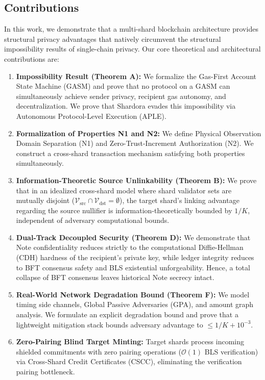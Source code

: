 \documentclass[journal,10pt,twocolumn]{IEEEtran}
\theoremstyle{definition}
\theoremstyle{remark}
\begin{document}
\subsection{Contributions}
In this work, we demonstrate that a multi-shard blockchain architecture provides structural privacy advantages that natively circumvent the structural impossibility results of single-chain privacy. Our core theoretical and architectural contributions are:
\begin{enumerate}[leftmargin=*]
    \item \textbf{Impossibility Result (Theorem A):} We formalize the Gas-First Account State Machine (GASM) and prove that no protocol on a GASM can simultaneously achieve sender privacy, recipient gas autonomy, and decentralization. We prove that Shardora evades this impossibility via Autonomous Protocol-Level Execution (APLE).
    \item \textbf{Formalization of Properties N1 and N2:} We define Physical Observation Domain Separation (N1) and Zero-Trust-Increment Authorization (N2). We construct a cross-shard transaction mechanism satisfying both properties simultaneously.
    \item \textbf{Information-Theoretic Source Unlinkability (Theorem B):} We prove that in an idealized cross-shard model where shard validator sets are mutually disjoint ($\mathcal{V}_{\text{src}} \cap \mathcal{V}_{\text{dst}} = \emptyset$), the target shard's linking advantage regarding the source nullifier is information-theoretically bounded by $1/K$, independent of adversary computational bounds.
    \item \textbf{Dual-Track Decoupled Security (Theorem D):} We demonstrate that Note confidentiality reduces strictly to the computational Diffie-Hellman (CDH) hardness of the recipient's private key, while ledger integrity reduces to BFT consensus safety and BLS existential unforgeability. Hence, a total collapse of BFT consensus leaves historical Note secrecy intact.
    \item \textbf{Real-World Network Degradation Bound (Theorem F):} We model timing side channels, Global Passive Adversaries (GPA), and amount graph analysis. We formulate an explicit degradation bound and prove that a lightweight mitigation stack bounds adversary advantage to $\le 1/K + 10^{-3}$.
    \item \textbf{Zero-Pairing Blind Target Minting:} Target shards process incoming shielded commitments with zero pairing operations ($\mathcal{O}(1)$ BLS verification) via Cross-Shard Credit Certificates (CSCC), eliminating the verification pairing bottleneck.
\end{enumerate}
\end{document}
